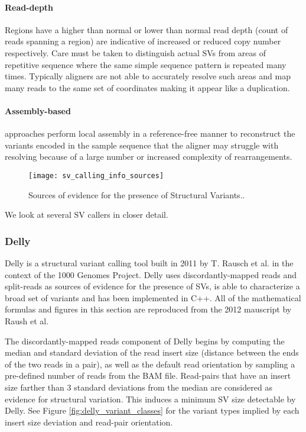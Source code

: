 \paragraph{Read-depth} Regions have a higher than normal or lower than normal read depth (count of reads spanning a region) are indicative of increased or reduced copy number respectively. Care must be taken to distinguish actual SVs from areas of repetitive sequence where the same simple sequence pattern is repeated many times. Typically aligners are not able to accurately resolve such areas and map many reads to the same set of coordinates making it appear like a duplication.

\paragraph{Assembly-based} approaches perform local assembly in a reference-free manner to reconstruct the variants encoded in the sample sequence that the aligner may struggle with resolving because of a large number or increased complexity of rearrangements.

\begin{figure}[H]
    \texttt{[image: sv\_calling\_info\_sources]}
    \centering
    \caption {Sources of evidence for the presence of Structural Variants.\autocite{zhao2013computational}.}
    \label{fig:sv_calling_info_sources}
\end{figure}

We look at several SV callers in closer detail.

\subsubsection{Delly}

Delly\autocite{rausch2012delly} is a structural variant calling tool built in 2011 by T. Rausch et al. in the context of the 1000 Genomes Project. Delly uses discordantly-mapped reads and split-reads as sources of evidence for the presence of SVs, is able to characterize a broad set of variants and has been implemented in C++. All of the mathematical formulas and figures in this section are reproduced from the 2012 mauscript by Raush et al.

The discordantly-mapped reads component of Delly begins by computing the median and standard deviation of the read insert size (distance between the ends of the two reads in a pair), as well as the default read orientation by sampling a pre-defined number of reads from the BAM file. Read-pairs that have an insert size farther than 3 standard deviations from the median are considered as evidence for structural variation. This induces a minimum SV size detectable by Delly. See Figure \ref{fig:delly_variant_classes} for the variant types implied by each insert size deviation and read-pair orientation.

